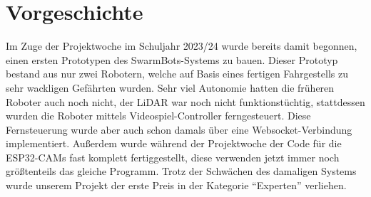 \chapter{Vorgeschichte}
\label{sec:vorgeschichte}
Im Zuge der Projektwoche im Schuljahr 2023/24 wurde bereits damit begonnen,
einen ersten Prototypen des SwarmBots-Systems zu bauen.
%
Dieser Prototyp bestand aus nur zwei Robotern,
welche auf Basis eines fertigen Fahrgestells zu sehr wackligen Gefährten wurden.
%
Sehr viel Autonomie hatten die früheren Roboter auch noch nicht,
der LiDAR war noch nicht funktionstüchtig,
stattdessen wurden die Roboter mittels Videospiel-Controller ferngesteuert.
%
Diese Fernsteuerung wurde aber auch schon damals über eine Websocket-Verbindung implementiert.
%
Außerdem wurde während der Projektwoche der Code für die ESP32-CAMs fast komplett fertiggestellt,
diese verwenden jetzt immer noch größtenteils das gleiche Programm.
%
Trotz der Schwächen des damaligen Systems wurde unserem Projekt
der erste Preis in der Kategorie ``Experten'' verliehen.


